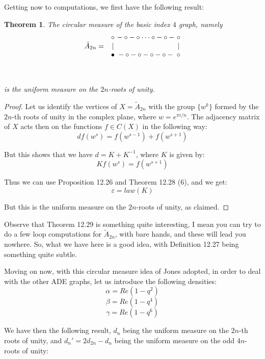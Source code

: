 \documentclass[12pt]{amsbook}
\newtheorem{theorem}{Theorem}[chapter]
\begin{document}
Getting now to computations, we first have the following result:

\begin{theorem}
The circular measure of the basic index $4$ graph, namely 
$$\begin{matrix}
&\circ&\!\!\!\!-\circ-\circ\cdots\circ-\circ-&\!\!\!\!\circ\cr
\tilde{A}_{2n}=&|&&\!\!\!\!|\cr
&\bullet&\!\!\!\!-\circ-\circ-\circ-\circ-&\!\!\!\!\circ\cr\cr\cr\end{matrix}$$
\vskip-10mm

\noindent is the uniform measure on the $2n$-roots of unity.
\end{theorem}

\begin{proof}
Let us identify the vertices of $X=\tilde{A}_{2n}$ with the group $\{w^k\}$ formed by the $2n$-th roots of unity in the complex plane, where $w=e^{\pi i/n}$. The adjacency matrix of $X$ acts then on the functions $f\in C(X)$ in the following way:
$$df(w^s)=f(w^{s-1})+f(w^{s+1})$$

But this shows that we have $d=K+K^{-1}$, where $K$ is given by:
$$Kf(w^s)=f(w^{s+1})$$

Thus we can use Proposition 12.26 and Theorem 12.28 (6), and we get:
$$\varepsilon=law(K)$$

But this is the uniform measure on the $2n$-roots of unity, as claimed.
\end{proof}

Observe that Theorem 12.29 is something quite interesting, I mean you can try to do a few loop computations for $\tilde{A}_{2n}$, with bare hands, and these will lead you nowhere. So, what we have here is a good idea, with Definition 12.27 being something quite subtle.

\bigskip

Moving on now, with this circular measure idea of Jones adopted, in order to deal with the other ADE graphs, let us introduce the following densities:
$$\alpha=Re(1-q^2)$$
$$\beta=Re(1-q^4)$$
$$\gamma=Re(1-q^6)$$

We have then the following result, $d_n$ being the uniform measure on the $2n$-th roots of unity, and $d_n'=2d_{2n}-d_n$ being the uniform measure on the odd $4n$-roots of unity:

\end{document}
